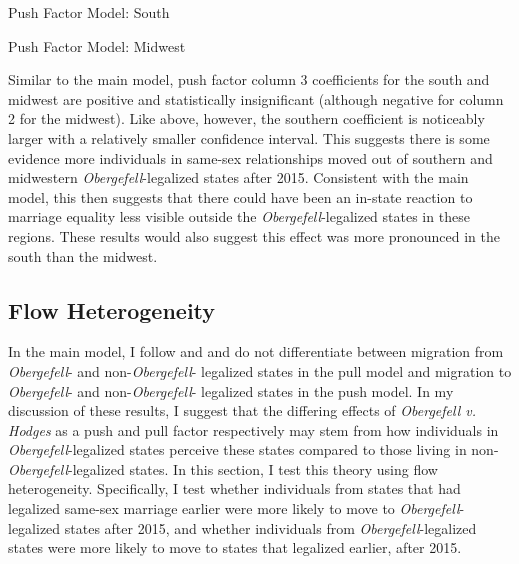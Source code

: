 \documentclass[12pt,letterpaper]{article}
\begin{document}
\begin{table}[htbp] %
    \centering
    \caption{Push Factor Model: South}
    \label{tab: south_exante_model}
    
\end{table}
\begin{table}[htbp] %
    \centering
    \caption{Push Factor Model: Midwest}
    \label{tab: midwest_exante_model}
    
\end{table}

Similar to the main model, push factor column 3 coefficients for the south and midwest are positive and statistically insignificant (although negative for column 2 for the midwest). Like above, however, the southern coefficient is noticeably larger with a relatively smaller confidence interval. This suggests there is some evidence more individuals in same-sex relationships moved out of southern and midwestern \textit{Obergefell}-legalized states after 2015. Consistent with the main model, this then suggests that there could have been an in-state reaction to marriage equality less visible outside the \textit{Obergefell}-legalized states in these regions. These results would also suggest this effect was more pronounced in the south than the midwest.


\FloatBarrier
\subsection{Flow Heterogeneity}


In the main model, I follow \citet{1} and \citet{12} and do not differentiate between migration from \textit{Obergefell}- and non-\textit{Obergefell}- legalized states in the pull model and migration to \textit{Obergefell}- and non-\textit{Obergefell}- legalized states in the push model.  In my discussion of these results, I suggest that the differing effects of \textit{Obergefell v. Hodges} as a push and pull factor respectively may stem from how individuals in \textit{Obergefell}-legalized states perceive these states compared to those living in non-\textit{Obergefell}-legalized states.  In this section, I test this theory using flow heterogeneity.  Specifically, I test whether individuals from states that had legalized same-sex marriage earlier were more likely to move to \textit{Obergefell}-legalized states after 2015, and whether individuals from \textit{Obergefell}-legalized states were more likely to move to states that legalized earlier, after 2015.
\end{document}
